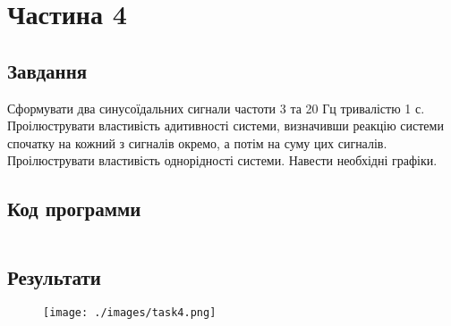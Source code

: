 \section{Частина 4}
\label{sec:task4}

\subsection{Завдання}
\label{subsec:task4_task}

Сформувати два синусоїдальних сигнали частоти 3 та 20 Гц
тривалістю 1 с. Проілюструвати властивість адитивності системи,
визначивши реакцію системи спочатку на кожний з сигналів окремо, а потім на
суму цих сигналів. Проілюструвати властивість однорідності системи.
Навести необхідні графіки.

\subsection{Код программи}
\label{subsec:task4_code}
\inputminted{python}{../src/task4.py}

\subsection{Результати}
\label{subsec:task4_results}

\begin{figure}[!ht]
    \centering
    \texttt{[image: ./images/task4.png]}
\end{figure}
